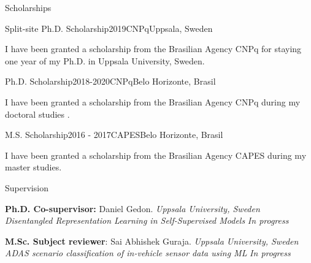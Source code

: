\documentclass{resume} %
\begin{document}
\begin{rSection}{Scholarships}

\begin{rSubsection}{Split-site Ph.D. Scholarship}{2019}{CNPq}{Uppsala, Sweden}

\item I have been granted a scholarship from the Brasilian Agency CNPq for staying one year  of my Ph.D. in Uppsala University, Sweden.
\end{rSubsection}


\begin{rSubsection}{Ph.D. Scholarship}{2018-2020}{CNPq}{Belo Horizonte, Brasil}

\item I have been granted a scholarship from the Brasilian Agency CNPq during my doctoral studies .
\end{rSubsection}


\begin{rSubsection}{M.S. Scholarship}{2016 - 2017}{CAPES}{Belo Horizonte, Brasil}

\item  I have been granted a scholarship from the Brasilian Agency CAPES during my master studies.
\end{rSubsection}


\end{rSection}




\begin{rSection}{Supervision}

{\bf Ph.D. Co-supervisor: }Daniel Gedon.  \hfill {\em Uppsala University, Sweden}\\
\textit{Disentangled Representation Learning in Self-Supervised Models} \hfill {\em  In progress}


{\bf M.Sc. Subject reviewer}: Sai Abhishek Guraja.  \hfill {\em Uppsala University, Sweden}\\
\textit{ADAS scenario classification of in-vehicle sensor data using ML} \hfill {\em In progress}

\end{rSection}
\end{document}
